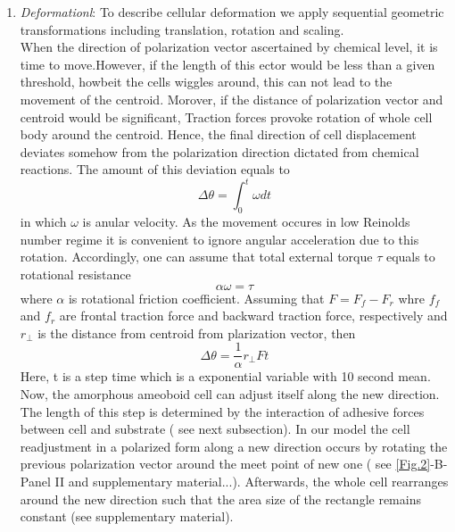 \documentclass[10pt,letterpaper]{article}
\begin{document}
\begin{enumerate}

\item \textit{Deformationl}: To describe cellular deformation we apply sequential geometric transformations including translation, rotation and scaling.\\
When the direction of polarization vector ascertained by chemical level, it is time to move.However, if the length of this ector would be less than a given threshold, howbeit the cells wiggles around, this can not  lead to the movement of the centroid. Morover, if the distance of polarization vector and centroid would be significant, Traction forces provoke rotation of whole cell body around the centroid. Hence, the final direction of cell displacement deviates somehow from the polarization direction dictated from chemical reactions. The amount of this deviation equals to  
\begin{equation}
\Delta \theta=\int_{0}^{t} \omega dt
\end{equation}
in which $\omega$ is anular velocity. As the  movement occures in low Reinolds number regime it is convenient to ignore angular acceleration due to this rotation. Accordingly, one can assume that  total external torque $\tau$ equals to rotational resistance
\begin{equation}
\alpha \omega=\tau
\end{equation}
where $\alpha$ is rotational friction coefficient. Assuming that $F=F_f -F_r$ whre $f_f$ and $f_r$ are  frontal traction force and backward traction force, respectively and $r_{\perp}$ is the distance from centroid from plarization vector, then
\begin{equation}
\Delta \theta=\frac{1}{\alpha}r_{\perp}F t
\end{equation} 
 Here, t is a step time which is a exponential variable with 10 second mean.\\
Now, the amorphous ameoboid cell can adjust itself along the new direction. The length of this step is determined by the interaction of adhesive forces between cell and substrate ( see next subsection). In our model the cell readjustment in a polarized form along a new direction occurs by rotating the previous polarization vector around the meet point of new one ( see \ref{Fig.2}-B-Panel II and supplementary material...). Afterwards, the whole cell rearranges around the new direction such that the area size of the rectangle remains constant (see supplementary material).


\end{enumerate}
\end{document}
